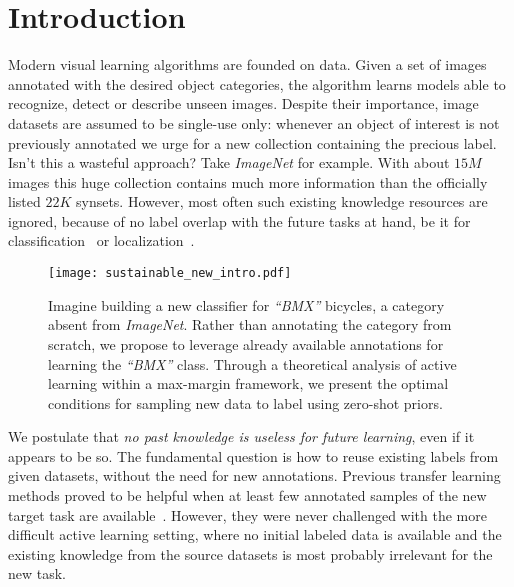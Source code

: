 \documentclass[10pt,twocolumn,letterpaper]{article}
\newcommand{\cgm}[1]{\textcolor{purple}{\textbf{CS}: #1}}
\begin{document}
\section{Introduction}

Modern visual learning algorithms are founded on data. Given a set of images annotated with the desired object categories, the algorithm learns models able to recognize, detect or describe unseen images. Despite their importance, image datasets are assumed to be single-use only: whenever an object of interest is not previously annotated we urge for a new collection containing the precious label. Isn't this a wasteful approach? Take \emph{ImageNet}\cite{imagenet_cvpr09} for example. With about $15M$ images this huge collection contains much more information than the officially listed $22K$ synsets. 
However, most often such existing knowledge resources are ignored, because of no label overlap with the future tasks at hand, be it for classification~\cite{Freytag14, KovashkaVG11, Tommasi_BMVC_2012} or localization~\cite{VijayanarasimhanJG10, VezhnevetsBF12, LiECCV2014}.

\begin{figure}[t!]
    \centering
    \texttt{[image: sustainable\_new\_intro.pdf]}
    \caption{Imagine building a new classifier for \emph{``BMX''} bicycles, a category absent from \emph{ImageNet}. Rather than annotating the category from scratch, we propose to leverage already available annotations for learning the \emph{``BMX''} class. Through a theoretical analysis of active learning within a max-margin framework, we present the optimal conditions for sampling new data to label using zero-shot priors. \vspace{-5mm}}
\label{fig:intro}
\end{figure}%

We postulate that \emph{no past knowledge is useless for future learning}, even if it appears to be so.
The fundamental question is how to reuse existing labels from given datasets, without the need for new annotations.
Previous transfer learning methods proved to be helpful when at least few annotated samples of the new target task are available~\cite{Pan_survey}. However, they were never challenged with the more difficult active learning setting, where no initial labeled data is available and the existing knowledge from the source datasets is most probably irrelevant for the new task.
\end{document}
